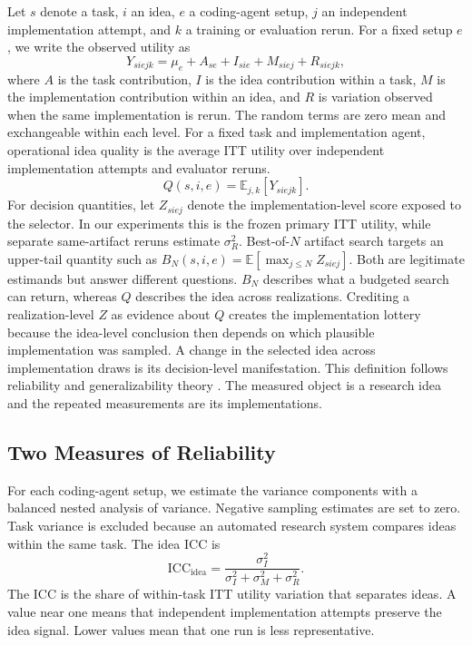 \documentclass[letterpaper]{article}
\begin{document}
Let $s$ denote a task, $i$ an idea, $e$ a coding-agent setup, $j$ an independent implementation attempt, and $k$ a training or evaluation rerun. For a fixed setup $e$, we write the observed utility as
\begin{equation}
Y_{siejk} = \mu_e + A_{se} + I_{sie} + M_{siej} + R_{siejk},
\label{eq:nested}
\end{equation}
where $A$ is the task contribution, $I$ is the idea contribution within a task, $M$ is the implementation contribution within an idea, and $R$ is variation observed when the same implementation is rerun. The random terms are zero mean and exchangeable within each level. For a fixed task and implementation agent, operational idea quality is the average ITT utility over independent implementation attempts and evaluator reruns.
\begin{equation}
Q(s,i,e) = \mathbb{E}_{j,k}[Y_{siejk}].
\end{equation}
For decision quantities, let $Z_{siej}$ denote the implementation-level score exposed to the selector. In our experiments this is the frozen primary ITT utility, while separate same-artifact reruns estimate $\sigma_R^2$. Best-of-$N$ artifact search targets an upper-tail quantity such as $B_N(s,i,e)=\mathbb{E}[\max_{j\leq N}Z_{siej}]$. Both are legitimate estimands but answer different questions. $B_N$ describes what a budgeted search can return, whereas $Q$ describes the idea across realizations. Crediting a realization-level $Z$ as evidence about $Q$ creates the implementation lottery because the idea-level conclusion then depends on which plausible implementation was sampled. A change in the selected idea across implementation draws is its decision-level manifestation. This definition follows reliability and generalizability theory \cite{shrout1979icc,brennan2001generalizability}. The measured object is a research idea and the repeated measurements are its implementations.

\subsection{Two Measures of Reliability}

For each coding-agent setup, we estimate the variance components with a balanced nested analysis of variance. Negative sampling estimates are set to zero. Task variance is excluded because an automated research system compares ideas within the same task. The idea ICC is
\begin{equation}
\mathrm{ICC}_{\mathrm{idea}} =
\frac{\sigma_I^2}
{\sigma_I^2 + \sigma_M^2 + \sigma_R^2}.
\label{eq:icc}
\end{equation}
The ICC is the share of within-task ITT utility variation that separates ideas. A value near one means that independent implementation attempts preserve the idea signal. Lower values mean that one run is less representative.
\end{document}
